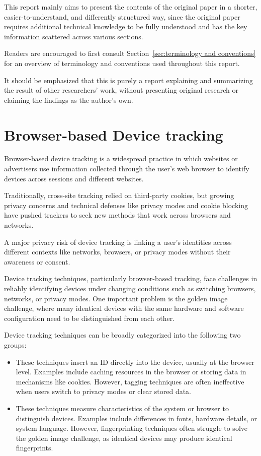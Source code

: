 \documentclass{report}
\begin{document}
This report mainly aims to present the contents of the original paper in a shorter, easier-to-understand, and differently structured way, since the original paper requires additional technical knowledge to be fully understood and has the key information scattered across various sections.

Readers are encouraged to first consult Section~\ref{sec:terminology and conventions} for an overview of terminology and conventions used throughout this report.

\alert{It should be emphasized that this is purely a report explaining and summarizing the result of other researchers' work, without presenting original research or claiming the findings as the author's own.}

\section{Browser-based Device tracking}
\label{sec:Online browser-based device tracking}

\alert{Browser-based device tracking} is a widespread practice in which websites or advertisers use information collected through the user’s web browser to identify devices across sessions and different websites.

Traditionally, cross-site tracking relied on \alert{third-party cookies}, but growing privacy concerns and technical defenses like privacy modes and cookie blocking have pushed trackers to seek new methods that work across browsers and networks.

A major \alert{privacy risk} of device tracking is linking a user’s identities across different contexts like networks, browsers, or privacy modes without their awareness or consent.


Device tracking techniques, particularly browser-based tracking, face challenges in reliably identifying devices under changing conditions such as switching browsers, networks, or privacy modes. One important problem is the \alert{golden image challenge}, where many identical devices with the same hardware and software configuration need to be distinguished from each other.

Device tracking techniques can be broadly categorized into the following two groups:

\begin{itemize}
	\item {} These techniques insert an ID directly into the device, usually at the browser level. Examples include caching resources in the browser or storing data in mechanisms like cookies. However, tagging techniques are often ineffective when users switch to privacy modes or clear stored data.
	\item {} These techniques measure characteristics of the system or browser to distinguish devices. Examples include differences in fonts, hardware details, or system language. However, fingerprinting techniques often struggle to solve the golden image challenge, as identical devices may produce identical fingerprints.
\end{itemize}
\end{document}
